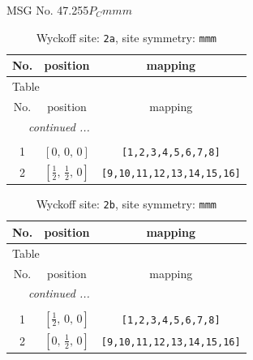 \documentclass[fleqn,8pt]{jsarticle}
\begin{document}
\setcounter{MaxMatrixCols}{32}

\renewcommand{\tablename}{Table~}
\renewcommand{\figurename}{Figure~}
\begin{center}
\LARGE
MSG No. 47.255\quad$P_{C}mmm$
\end{center}
\renewcommand{\arraystretch}{1.2}
\begin{longtable}{ccc}
\caption{Wyckoff site: {\tt 2a}, site symmetry: {\tt mmm}}
 \\
 \hline \hline
No. & position & mapping \\ \hline \endfirsthead

\multicolumn{2}{l}{\tablename\ \thetable{}} \\
 \hline \hline
No. & position & mapping \\ \hline \endhead

 \hline \hline
\multicolumn{2}{r}{\footnotesize\it continued ...} \\ \endfoot

 \hline \hline
\multicolumn{2}{r}{} \\ \endlastfoot

1 & $\left[ 0,\, 0,\, 0 \right]$ & {\tt [1,2,3,4,5,6,7,8]} \\ \hline
2 & $\left[ \frac{1}{2},\, \frac{1}{2},\, 0 \right]$ & {\tt [9,10,11,12,13,14,15,16]} \\
\end{longtable}
\renewcommand{\arraystretch}{1.2}
\begin{longtable}{ccc}
\caption{Wyckoff site: {\tt 2b}, site symmetry: {\tt mmm}}
 \\
 \hline \hline
No. & position & mapping \\ \hline \endfirsthead

\multicolumn{2}{l}{\tablename\ \thetable{}} \\
 \hline \hline
No. & position & mapping \\ \hline \endhead

 \hline \hline
\multicolumn{2}{r}{\footnotesize\it continued ...} \\ \endfoot

 \hline \hline
\multicolumn{2}{r}{} \\ \endlastfoot

1 & $\left[ \frac{1}{2},\, 0,\, 0 \right]$ & {\tt [1,2,3,4,5,6,7,8]} \\ \hline
2 & $\left[ 0,\, \frac{1}{2},\, 0 \right]$ & {\tt [9,10,11,12,13,14,15,16]} \\
\end{longtable}
\end{document}
